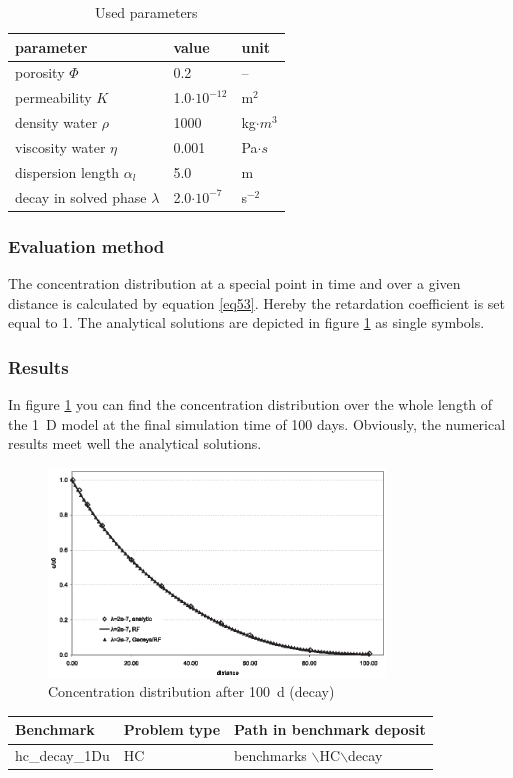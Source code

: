 \begin{table}[htbp]
\centering
\begin{tabular}{|l|l|l|}
\hline
parameter & value & unit \\
\hline
porosity $\Phi$  & 0.2 &  --  \\			
\hline
permeability $K$ & 1.0$\cdot 10^{-12}$ & m$^2$ \\
\hline
density water $\rho$ & 1000 & kg$\cdot m^3$ \\
\hline
viscosity water $\eta$ & 0.001 & Pa$\cdot s$ \\
\hline
dispersion length $\alpha_l$ & 5.0 & m \\
\hline
decay in solved phase $\lambda$ & 2.0$\cdot 10^{-7}$ & s$^{-2}$ \\
\hline
\end{tabular}
\caption{Used parameters}
\label{tab51}
\end{table}

\subsubsection*{Evaluation method}
The concentration distribution at a special point in time and over a given distance is calculated by equation \ref{eq53}. Hereby the retardation coefficient is set equal to 1. The analytical solutions are depicted in figure \ref{fig52} as single symbols.

\subsubsection*{Results}

In figure \ref{fig52} you can find the concentration distribution over the whole length of the 1~D model at the final simulation time of 100 days. Obviously, the numerical results meet well the analytical solutions.

\begin{figure}[htbp]
\centering
\includegraphics[width=0.8\textwidth]{C/figures/fig52.eps}
\caption{Concentration distribution after 100~d (decay)}
\label{fig52}
\end{figure}

\begin{tabular}{|l|l|l|}
\hline
Benchmark & Problem type	& Path in benchmark deposit \\
\hline	
hc\_decay\_1Du	& HC	& benchmarks $\backslash$HC$\backslash$decay \\
\hline	
\end{tabular}

